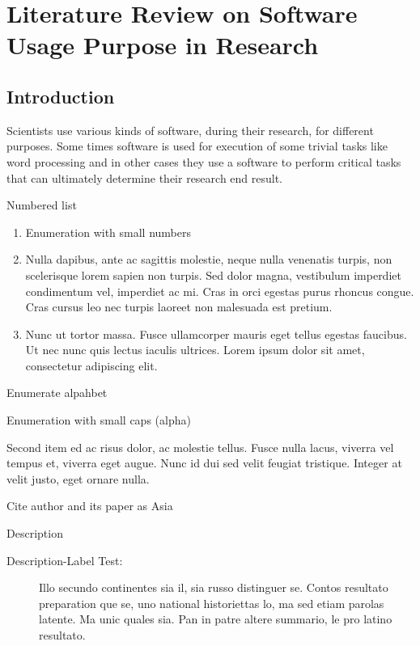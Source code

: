 \chapter{Literature Review on Software Usage Purpose in Research }
\label{ch:chapter03}
 

%
%
\section{Introduction}
\label{sec:chapter03:intro}
Scientists use various kinds of software, during their research, for different purposes. Some times software is used for execution of some trivial tasks like word processing and in other cases they use a software to perform critical tasks that can ultimately determine their research end result. 


Numbered list 

\begin{enumerate}
 \item Enumeration with small numbers
 \item Nulla dapibus, ante ac sagittis molestie, neque nulla venenatis turpis, non scelerisque lorem sapien non turpis. Sed dolor magna, vestibulum imperdiet condimentum vel, imperdiet ac mi. Cras in orci egestas purus rhoncus congue. Cras cursus leo nec turpis laoreet non malesuada est pretium.
 \item Nunc ut tortor massa. Fusce ullamcorper mauris eget tellus egestas faucibus. Ut nec nunc quis lectus iaculis ultrices. Lorem ipsum dolor sit amet, consectetur adipiscing elit.
\end{enumerate}

Enumerate alpahbet

\begin{aenumerate}
 \item Enumeration with small caps (alpha)
 \item Second item ed ac risus dolor, ac molestie tellus. Fusce nulla lacus, viverra vel tempus et, viverra eget augue. Nunc id dui sed velit feugiat tristique. Integer at velit justo, eget ornare nulla.

\end{aenumerate}

Cite author and its paper as  Asia \citeauthor{bentley:1999} \citep{bentley:1999} 

Description
\begin{description}
  \item[Description-Label Test:] Illo secundo continentes sia il, sia russo distinguer se. Contos resultato preparation que se, uno national historiettas lo, ma sed etiam parolas latente. Ma unic quales sia. Pan in patre altere summario, le pro latino resultato.
 
\end{description}

